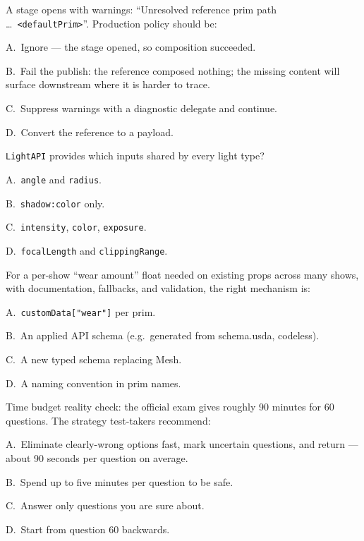 A stage opens with warnings: ``Unresolved reference prim path \ldots\
\texttt{<defaultPrim>}''. Production policy should be:
\begin{Choices}
  \item A.\ Ignore --- the stage opened, so composition succeeded.
  \item B.\ Fail the publish: the reference composed nothing; the missing content will surface downstream where it is harder to trace.
  \item C.\ Suppress warnings with a diagnostic delegate and continue.
  \item D.\ Convert the reference to a payload.
\end{Choices}

\texttt{LightAPI} provides which inputs shared by every light type?
\begin{Choices}
  \item A.\ \texttt{angle} and \texttt{radius}.
  \item B.\ \texttt{shadow:color} only.
  \item C.\ \texttt{intensity}, \texttt{color}, \texttt{exposure}.
  \item D.\ \texttt{focalLength} and \texttt{clippingRange}.
\end{Choices}

For a per-show ``wear amount'' float needed on existing props across many
shows, with documentation, fallbacks, and validation, the right mechanism
is:
\begin{Choices}
  \item A.\ \texttt{customData["wear"]} per prim.
  \item B.\ An applied API schema (e.g.\ generated from schema.usda, codeless).
  \item C.\ A new typed schema replacing Mesh.
  \item D.\ A naming convention in prim names.
\end{Choices}

Time budget reality check: the official exam gives roughly 90 minutes for
60 questions. The strategy test-takers recommend:
\begin{Choices}
  \item A.\ Eliminate clearly-wrong options fast, mark uncertain questions, and return --- about 90 seconds per question on average.
  \item B.\ Spend up to five minutes per question to be safe.
  \item C.\ Answer only questions you are sure about.
  \item D.\ Start from question 60 backwards.
\end{Choices}
